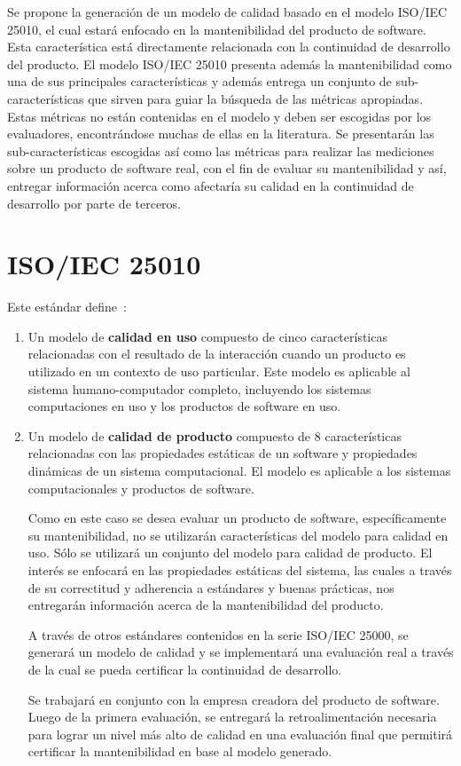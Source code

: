 Se propone la generación de un modelo de calidad basado en el 
modelo ISO/IEC 25010, el cual estará enfocado en la mantenibilidad del producto 
de software. Esta característica está directamente relacionada con la 
continuidad de desarrollo del producto.
El modelo ISO/IEC 25010 presenta además la mantenibilidad como una de sus principales
características y además entrega un conjunto de sub-características que sirven para
guiar la búsqueda de las métricas apropiadas.
Estas métricas no están contenidas en el modelo y deben ser escogidas por los evaluadores, 
encontrándose muchas de ellas en la literatura.
Se presentarán las sub-características escogidas así como las 
métricas para realizar las mediciones sobre un producto de software real, 
con el fin de evaluar su mantenibilidad y así, entregar información acerca como afectaría
su calidad en la continuidad de desarrollo por parte de terceros.

\section{ISO/IEC 25010}

Este estándar define~\cite{25010}:

\begin{enumerate}
\item Un modelo de \textbf{calidad en uso} compuesto de cinco características
relacionadas con el resultado de la interacción cuando un producto es utilizado
en un contexto de uso particular. Este modelo es aplicable al sistema
humano-computador completo, incluyendo los sistemas computaciones en uso
y los productos de software en uso.

\item Un modelo de \textbf{calidad de producto} compuesto de 8 características relacionadas
con las propiedades estáticas de un software y propiedades dinámicas de un sistema
computacional. El modelo es aplicable a los sistemas computacionales y productos
de software.

Como en este caso se desea evaluar un producto de software, específicamente
su mantenibilidad, no se utilizarán características del modelo para calidad
en uso. Sólo se utilizará un conjunto del modelo para calidad de producto.
El interés se enfocará en las propiedades estáticas del sistema, las cuales
a través de su correctitud y adherencia a estándares y buenas prácticas, nos
entregarán información acerca de la mantenibilidad del producto.

A través de otros estándares contenidos en la serie ISO/IEC 25000, se generará
un modelo de calidad y se implementará una evaluación real a través de la cual se 
pueda certificar la continuidad de desarrollo.

Se trabajará en conjunto con la empresa creadora del producto de software.
Luego de la primera evaluación, se entregará la retroalimentación necesaria
para lograr un nivel más alto de calidad en una evaluación final que permitirá
certificar la mantenibilidad en base al modelo generado.
\end{enumerate}

